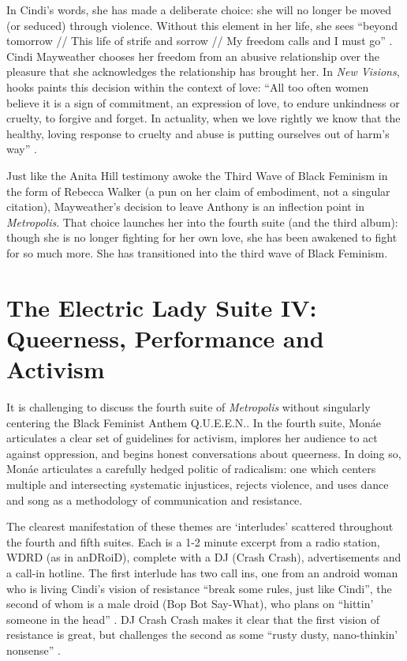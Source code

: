 \documentclass[a4paper, 11pt]{article} %
\begin{document}
In Cindi's words, she has made a deliberate choice: she will no longer be moved (or seduced) through violence. 
Without this element in her life, she sees ``beyond tomorrow // This life of strife and sorrow // My freedom calls and I must go'' .
Cindi Mayweather chooses her freedom from an abusive relationship over the pleasure that she acknowledges the relationship has brought her.
In \emph{New Visions}, hooks paints this decision within the context of love: ``All too often women believe it is a sign of commitment, an expression of love, to endure unkindness or cruelty, to forgive and forget. In actuality, when we love rightly we know that the healthy, loving response to cruelty and abuse is putting ourselves out of harm's way'' .

Just like the Anita Hill testimony awoke the Third Wave of Black Feminism in the form of Rebecca Walker  (a pun on her claim of embodiment, not a singular citation), Mayweather's decision to leave Anthony is an inflection point in \emph{Metropolis}.
That choice launches her into the fourth suite (and the third album): though she is no longer fighting for her own love, she has been awakened to fight for so much more. 
She has transitioned into the third wave of Black Feminism.



\section*{The Electric Lady Suite IV: Queerness, Performance and Activism}

It is challenging to discuss the fourth suite of \emph{Metropolis} without singularly centering the Black Feminist Anthem Q.U.E.E.N..
In the fourth suite, Mon\'ae articulates a clear set of guidelines for activism, implores her audience to act against oppression, and begins honest conversations about queerness.
In doing so, Mon\'ae articulates a carefully hedged politic of radicalism: one which centers multiple and intersecting systematic injustices, rejects violence, and uses dance and song as a methodology of communication and resistance.

The clearest manifestation of these themes are `interludes' scattered throughout the fourth and fifth suites.
Each is a 1-2 minute excerpt from a radio station, WDRD (as in anDRoiD), complete with a DJ (Crash Crash), advertisements and a call-in hotline.
The first interlude has two call ins, one from an android woman who is living Cindi's vision of resistance ``break some rules, just like Cindi'', the second of whom is a male droid (Bop Bot Say-What), who plans on ``hittin' someone in the head'' .
DJ Crash Crash makes it clear that the first vision of resistance is great, but challenges the second as some ``rusty dusty, nano-thinkin' nonsense'' .
\end{document}
